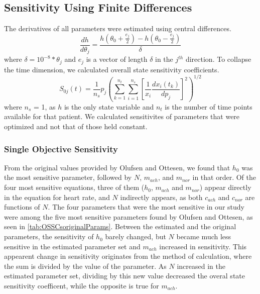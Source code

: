 \documentclass[fleqn,10pt]{wlscirep}
\begin{document}
\subsection*{Sensitivity Using Finite Differences}
The derivatives of all parameters were estimated using central differences. 
\begin{equation}
\frac{dh}{d\theta_j} = \frac{h(\theta_0+\frac{e_j}{2})-h(\theta_0-\frac{e_j}{2})}{\delta}
\end{equation}
where $\delta=10^{-8}*\theta_j$ and $e_j$ is a vector of length $\delta$ in the $j^{th}$ direction.
To collapse the time dimension, we calculated overall state sensitivity coefficients. \cite{stelling2004robustness}
\begin{equation}
S_{0j}(t) = \frac{1}{n_s}p_j \left(\sum_{k=1}^{n_t} \sum_{i=1}^{n_s} \left[ \frac{1}{x_i} \frac{dx_i(t_k)}{dp_j} \right]^2 \right)^{1/2}
\end{equation}
where $n_s$ = 1, as $h$ is the only state variable and $n_t$ is the number of time points available for that patient. We calculated sensitivites of parameters that were optimized and not that of those held constant.
\subsubsection*{Single Objective Sensitivity}
From the original values provided by Olufsen and Ottesen, we found that $h_0$ was the most sensitive parameter, followed by $N$, $m_{ach}$, and $m_{nor}$ in that order. Of the four most sensitive equations, three of them ($h_0$, $m_{ach}$ and $m_{nor}$) appear directly in the equation for heart rate, and $N$ indirectly appears, as both $c_{ach}$ and $c_{nor}$ are functions of $N$.
The four parameters that were the most sensitive in our study were among the five most sensitive parameters found by Olufsen and Ottesen, as seen in \ref{tab:OSSCsoriginalParams}. Between the estimated and the original parameters, the sensitivity of $h_0$ barely changed, but $N$ became much less sensitive in the estimated parameter set and $m_{ach}$ increased in sensitivity. This appearent change in sensitivity originates from the method of calculation, where the sum is divided by the value of the parameter. As $N$ increased in the estimated parameter set, dividing by this new value decreased the overal state sensitivity coefficent, while the opposite is true for $m_{ach}$.
\end{document}
